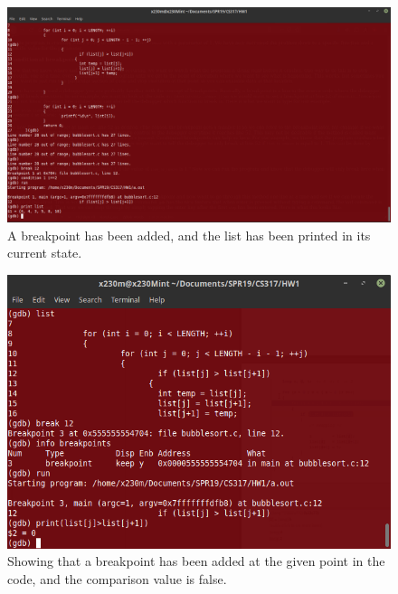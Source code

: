 \documentclass{article}
\begin{document}
\begin{figure}[H]

  \includegraphics[scale=0.4]{P15-2}
  \caption{A breakpoint has been added, and the list has been printed in its current state. }
\end{figure}



\begin{figure}[H]

  \includegraphics[scale=0.7]{P15-3}
  \caption{Showing that a breakpoint has been added at the given point in the code, and the comparison value is false.}
\end{figure}
\end{document}
